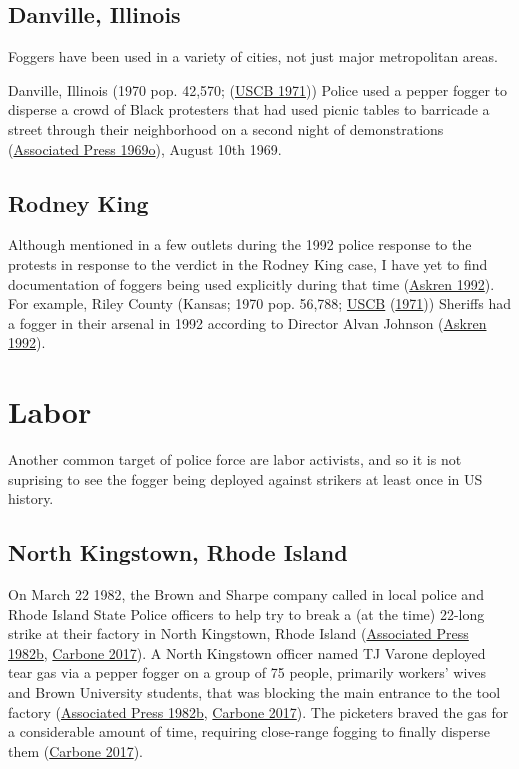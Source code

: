 \documentclass[
  11pt,
]{krantz}
\begin{document}
\hypertarget{danville-illinois}{%
\subsection{Danville, Illinois}\label{danville-illinois}}

Foggers have been used in a variety of cities, not just major metropolitan areas.

Danville, Illinois (1970 pop. 42,570; (\protect\hyperlink{ref-USCB1970}{USCB 1971})) Police used a pepper fogger to disperse a crowd of Black protesters that had used picnic tables to barricade a street through their neighborhood on a second night of demonstrations (\protect\hyperlink{ref-Palladium-Item1969}{Associated Press 1969o}), August 10th 1969.

\hypertarget{rodney-king}{%
\subsection{Rodney King}\label{rodney-king}}

Although mentioned in a few outlets during the 1992 police response to the protests in response to the verdict in the Rodney King case, I have yet to find documentation of foggers being used explicitly during that time (\protect\hyperlink{ref-Askren1992}{Askren 1992}).
For example, Riley County (Kansas; 1970 pop. 56,788; \protect\hyperlink{ref-USCB1970}{USCB} (\protect\hyperlink{ref-USCB1970}{1971})) Sheriffs had a fogger in their arsenal in 1992 according to Director Alvan Johnson (\protect\hyperlink{ref-Askren1992}{Askren 1992}).

\hypertarget{labor}{%
\section{Labor}\label{labor}}

Another common target of police force are labor activists, and so it is not suprising to see the fogger being deployed against strikers at least once in US history.

\hypertarget{north-kingstown-rhode-island}{%
\subsection{North Kingstown, Rhode Island}\label{north-kingstown-rhode-island}}

On March 22 1982, the Brown and Sharpe company called in local police and Rhode Island State Police officers to help try to break a (at the time) 22-long strike at their factory in North Kingstown, Rhode Island (\protect\hyperlink{ref-TheLexingtonHerald1982_03_23}{Associated Press 1982b}, \protect\hyperlink{ref-Carbone2017}{Carbone 2017}).
A North Kingstown officer named TJ Varone deployed tear gas via a pepper fogger on a group of 75 people, primarily workers' wives and Brown University students, that was blocking the main entrance to the tool factory (\protect\hyperlink{ref-TheLexingtonHerald1982_03_23}{Associated Press 1982b}, \protect\hyperlink{ref-Carbone2017}{Carbone 2017}).
The picketers braved the gas for a considerable amount of time, requiring close-range fogging to finally disperse them (\protect\hyperlink{ref-Carbone2017}{Carbone 2017}).
\end{document}

